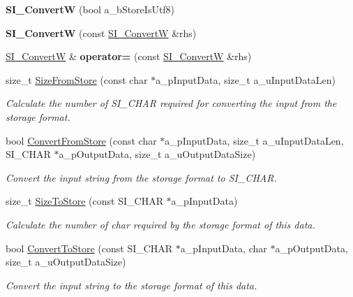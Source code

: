 \begin{DoxyCompactItemize}
\item 
{\bfseries S\+I\+\_\+\+ConvertW} (bool a\+\_\+b\+Store\+Is\+Utf8)\hypertarget{class_s_i___convert_w_a2dff5480be64970fdd309411eca5d68b}{}\label{class_s_i___convert_w_a2dff5480be64970fdd309411eca5d68b}

\item 
{\bfseries S\+I\+\_\+\+ConvertW} (const \hyperlink{class_s_i___convert_w}{S\+I\+\_\+\+ConvertW} \&rhs)\hypertarget{class_s_i___convert_w_a443e5fe7e7cf4a4972942f2b0a33c7c2}{}\label{class_s_i___convert_w_a443e5fe7e7cf4a4972942f2b0a33c7c2}

\item 
\hyperlink{class_s_i___convert_w}{S\+I\+\_\+\+ConvertW} \& {\bfseries operator=} (const \hyperlink{class_s_i___convert_w}{S\+I\+\_\+\+ConvertW} \&rhs)\hypertarget{class_s_i___convert_w_adb6fc210ad5c4beb894c03ddc1ff5085}{}\label{class_s_i___convert_w_adb6fc210ad5c4beb894c03ddc1ff5085}

\item 
size\+\_\+t \hyperlink{class_s_i___convert_w_aeb7cb9953fd07917c9a049c441add51e}{Size\+From\+Store} (const char $\ast$a\+\_\+p\+Input\+Data, size\+\_\+t a\+\_\+u\+Input\+Data\+Len)
\begin{DoxyCompactList}\small\item\em Calculate the number of S\+I\+\_\+\+C\+H\+AR required for converting the input from the storage format. \end{DoxyCompactList}\item 
bool \hyperlink{class_s_i___convert_w_a132a9317a6f69780fa6b818d3fcf59e9}{Convert\+From\+Store} (const char $\ast$a\+\_\+p\+Input\+Data, size\+\_\+t a\+\_\+u\+Input\+Data\+Len, S\+I\+\_\+\+C\+H\+AR $\ast$a\+\_\+p\+Output\+Data, size\+\_\+t a\+\_\+u\+Output\+Data\+Size)
\begin{DoxyCompactList}\small\item\em Convert the input string from the storage format to S\+I\+\_\+\+C\+H\+AR. \end{DoxyCompactList}\item 
size\+\_\+t \hyperlink{class_s_i___convert_w_a7619dba0ecb1b6ec28b4d16a89ed89c0}{Size\+To\+Store} (const S\+I\+\_\+\+C\+H\+AR $\ast$a\+\_\+p\+Input\+Data)
\begin{DoxyCompactList}\small\item\em Calculate the number of char required by the storage format of this data. \end{DoxyCompactList}\item 
bool \hyperlink{class_s_i___convert_w_ab30993d03cdc7b5d5635b95add8b7133}{Convert\+To\+Store} (const S\+I\+\_\+\+C\+H\+AR $\ast$a\+\_\+p\+Input\+Data, char $\ast$a\+\_\+p\+Output\+Data, size\+\_\+t a\+\_\+u\+Output\+Data\+Size)
\begin{DoxyCompactList}\small\item\em Convert the input string to the storage format of this data. \end{DoxyCompactList}\end{DoxyCompactItemize}


